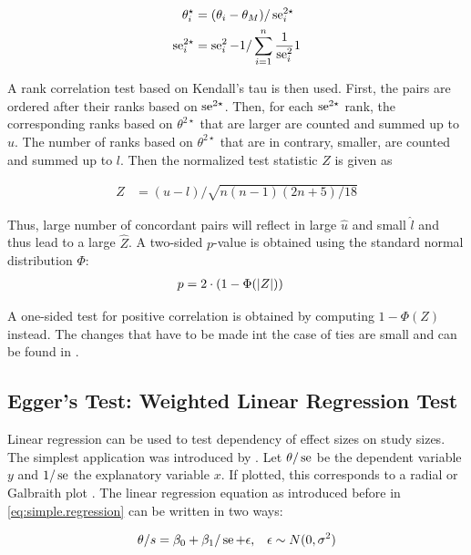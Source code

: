 \documentclass[11pt,a4paper,twoside]{book}\usepackage[]{graphicx}\usepackage[]{color}
\begin{document}
\begin{align}
\theta_i^\star &= (\theta_i - \theta_M)/\operatorname{se}_i^{2\star} \label{eq:begg.stand.eff}  \\
\operatorname{se}_i^{2\star} &= \operatorname{se}_i^2 - 1/\sum_{i = 1}^n\frac{1}{\operatorname{se}_i^2}1 \label{eq:begg.stand.var} 
\end{align}

A rank correlation test based on Kendall's tau is then used. First, the pairs are ordered after their ranks based on $\operatorname{se}^{2\star}$. Then, for each $\operatorname{se}^{2\star}$ rank, the corresponding ranks based on $\theta^{2\star}$ that are larger are counted and summed up to $u$. The number of ranks based on $\theta^{2\star}$ that are in contrary, smaller, are counted and summed up to $l$. Then the normalized test statistic $Z$ is given as

\begin{align}
Z &= (u - l)/\sqrt{n(n-1)(2n + 5)/18} \nonumber
\end{align}

Thus, large number of concordant pairs will reflect in large $\hat{u}$ and small $\hat{l}$ and thus lead to a large $\hat{Z}$. A two-sided $p$\hspace{0.4mm}-value is obtained using the standard normal distribution $\Phi$:
\begin{align}
p &= 2\cdot(1-\Phi(\left\lvert Z\right\rvert)) \nonumber
\end{align}

A one-sided test for positive correlation is obtained by computing $1-\Phi(Z)$ instead.
The changes that have to be made int the case of ties are small and can be found in \cite[410]{begg.ties}.


\subsection{Egger's Test: Weighted Linear Regression Test} \label{sec:Egger}
Linear regression can be used to test dependency of effect sizes on study sizes. The simplest application was introduced by \citet{Egger}.
Let $\theta/\operatorname{se}$ be the dependent variable $y$ and $1/\operatorname{se}$ the explanatory variable $x$. If plotted, this corresponds to a radial or Galbraith plot \citep{galbraith}. The linear regression equation as introduced before in \eqref{eq:simple.regression} can be written in two ways:

\begin{align}
\theta/s &= \beta_0 + \beta_1/\operatorname{se} + \epsilon, & \epsilon \sim N(0, \sigma^2) \label{eq:radial.plot} 
\end{align}
\end{document}
